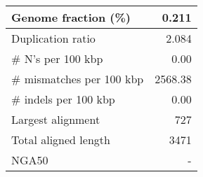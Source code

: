 \documentclass[12pt,a4paper]{article}
\begin{document}
\begin{table}[ht]
\begin{center}
\begin{tabular}{|l*{1}{|r}|}
Genome fraction (\%) & 0.211 \\ \hline
Duplication ratio & 2.084 \\ \hline
\# N's per 100 kbp & 0.00 \\ \hline
\# mismatches per 100 kbp & 2568.38 \\ \hline
\# indels per 100 kbp & 0.00 \\ \hline
Largest alignment & 727 \\ \hline
Total aligned length & 3471 \\ \hline
NGA50 & - \\ \hline
\end{tabular}
\end{center}
\end{table}
\end{document}
